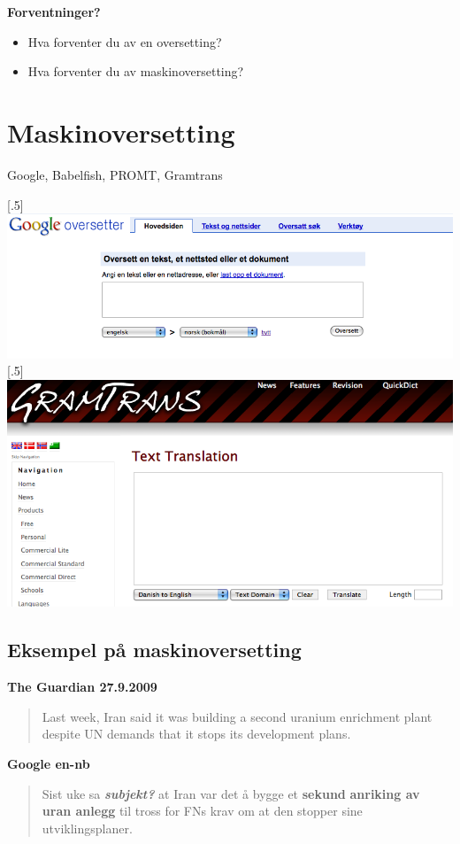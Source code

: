 \documentclass[a4paper,english,12pt]{article}
\begin{document}
\begin{spacing}{1.0}
\textbf{Forventninger?}
 
\begin{itemize}
\item Hva forventer du av en oversetting?
\item Hva forventer du av maskinoversetting?
\end{itemize}


\section{Maskinoversetting}

Google, Babelfish, PROMT, Gramtrans


\scalebox{.5}[.5]{\includegraphics{google.png}} \\
\scalebox{.5}[.5]{\includegraphics{gramtrans.png}}

\subsection{Eksempel på maskinoversetting}

\textbf{The Guardian 27.9.2009}
\begin{quote}
Last week, Iran said it was building a second uranium enrichment plant despite UN demands that it stops its development plans.
\end{quote}  


\textbf{Google en-nb}
\begin{quote}
Sist uke sa \textit{\textbf{subjekt?}} at Iran var det å bygge et \textbf{sekund} \textbf{anriking av uran anlegg} til tross for FNs krav om at den stopper sine utviklingsplaner.
\end{quote}  


\end{spacing}
\end{document}
